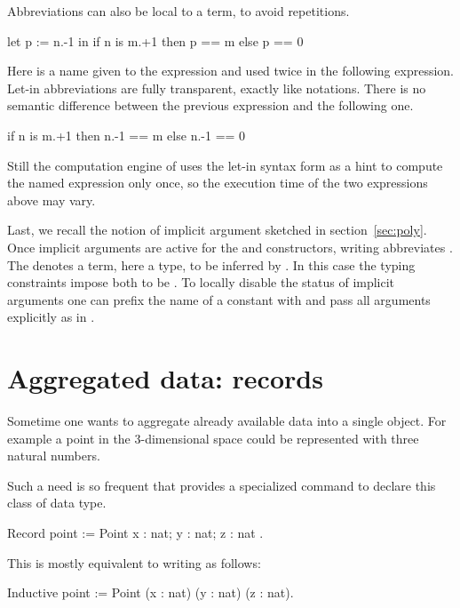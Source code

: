 Abbreviations can also be local to a term, to avoid repetitions.

\begin{coq}{}{}
let p := n.-1 in
  if n is m.+1 then p == m else p == 0
\end{coq}
Here  is a name given to the expression  and
used twice in the following expression.  Let-in abbreviations are
fully transparent, exactly like notations.  There is no semantic
difference between the previous expression and the following one.

\begin{coq}{}{}
  if n is m.+1 then n.-1 == m else n.-1 == 0
\end{coq}
Still the computation engine of \Coq{} uses the let-in syntax form
as a hint
to compute the named expression only once, so the execution time
of the two expressions above may vary.

Last, we recall the notion of implicit argument sketched in
section~\ref{sec:poly}.  Once implicit arguments are active for
the  and  constructors, writing  
abbreviates .  The \C{_} denotes a term,
here a type, to be inferred by \Coq{}.  In this case the typing constraints
impose both \C{_} to be .  To locally disable the
status of implicit arguments one can prefix the name of a
constant with  and pass all arguments explicitly as in
.

\section{Aggregated data: records}
\label{sec:records}

Sometime one wants to aggregate already available data into a single object.
For example a point in the 3-dimensional space could be represented with
three natural numbers.

Such a need is so frequent that \Coq{} provides a specialized command
to declare this class of data type.

\begin{coq}{}{}
Record point := Point { x : nat; y : nat; z : nat }.
\end{coq}
This is mostly equivalent to writing as follows:

\begin{coq}{}{}
Inductive point := Point (x : nat) (y : nat) (z : nat).
\end{coq}

